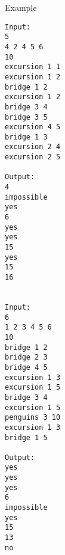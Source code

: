 Example
\begin{verbatim}
Input:
5
4 2 4 5 6
10
excursion 1 1
excursion 1 2
bridge 1 2
excursion 1 2
bridge 3 4
bridge 3 5
excursion 4 5
bridge 1 3
excursion 2 4
excursion 2 5

Output:
4
impossible
yes
6
yes
yes
15
yes
15
16


Input:
6
1 2 3 4 5 6
10
bridge 1 2
bridge 2 3
bridge 4 5
excursion 1 3
excursion 1 5
bridge 3 4
excursion 1 5
penguins 3 10
excursion 1 3
bridge 1 5

Output:
yes
yes
yes
6
impossible
yes
15
13
no
\end{verbatim}